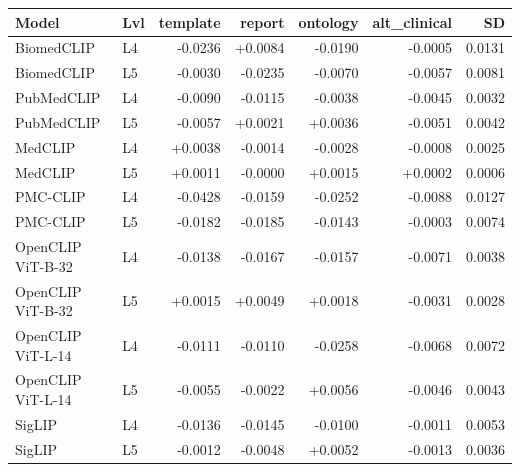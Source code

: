 \begin{tabular}{llrrrrr}
\toprule
Model & Lvl & template & report & ontology & alt_clinical & SD \\
\midrule
BiomedCLIP & L4 & -0.0236 & +0.0084 & -0.0190 & -0.0005 & 0.0131 \\
BiomedCLIP & L5 & -0.0030 & -0.0235 & -0.0070 & -0.0057 & 0.0081 \\
PubMedCLIP & L4 & -0.0090 & -0.0115 & -0.0038 & -0.0045 & 0.0032 \\
PubMedCLIP & L5 & -0.0057 & +0.0021 & +0.0036 & -0.0051 & 0.0042 \\
MedCLIP & L4 & +0.0038 & -0.0014 & -0.0028 & -0.0008 & 0.0025 \\
MedCLIP & L5 & +0.0011 & -0.0000 & +0.0015 & +0.0002 & 0.0006 \\
PMC-CLIP & L4 & -0.0428 & -0.0159 & -0.0252 & -0.0088 & 0.0127 \\
PMC-CLIP & L5 & -0.0182 & -0.0185 & -0.0143 & -0.0003 & 0.0074 \\
OpenCLIP ViT-B-32 & L4 & -0.0138 & -0.0167 & -0.0157 & -0.0071 & 0.0038 \\
OpenCLIP ViT-B-32 & L5 & +0.0015 & +0.0049 & +0.0018 & -0.0031 & 0.0028 \\
OpenCLIP ViT-L-14 & L4 & -0.0111 & -0.0110 & -0.0258 & -0.0068 & 0.0072 \\
OpenCLIP ViT-L-14 & L5 & -0.0055 & -0.0022 & +0.0056 & -0.0046 & 0.0043 \\
SigLIP & L4 & -0.0136 & -0.0145 & -0.0100 & -0.0011 & 0.0053 \\
SigLIP & L5 & -0.0012 & -0.0048 & +0.0052 & -0.0013 & 0.0036 \\
\bottomrule
\end{tabular}
